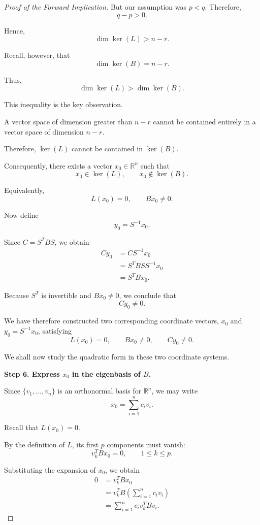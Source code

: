 \documentclass[11pt]{article}
\theoremstyle{definition}
\theoremstyle{remark}
\begin{document}
\begin{proof}[Proof of the Forward Implication]
But our assumption was $p<q$.
Therefore,
\[
    q-p>0.
\]

Hence,
\[
    \boxed{\dim\ker(L)>n-r}.
\]

Recall, however, that
\[
    \dim\ker(B)=n-r.
\]

Thus,
\[
    \boxed{
    \dim\ker(L)>\dim\ker(B).
    }
\]

This inequality is the key observation.

A vector space of dimension greater
than $n-r$ cannot be contained entirely
in a vector space of dimension $n-r$.

Therefore, $\ker(L)$ cannot be contained
in $\ker(B)$.

Consequently, there exists a vector
$x_0\in\mathbb{R}^n$ such that
\[
    \boxed{
    x_0\in\ker(L),
    \qquad
    x_0\notin\ker(B).
    }
\]

Equivalently,
\[
    \boxed{
    L(x_0)=0,
    \qquad
    Bx_0\neq 0.
    }
\]

Now define
\[
    \boxed{y_0=S^{-1}x_0}.
\]

Since $C=S^TBS$, we obtain
\[
\begin{aligned}
    Cy_0
    &=CS^{-1}x_0\\
    &=S^TBS S^{-1}x_0\\
    &=S^TBx_0.
\end{aligned}
\]

Because $S^T$ is invertible and
$Bx_0\neq 0$, we conclude that
\[
    \boxed{Cy_0\neq 0}.
\]

We have therefore constructed two
corresponding coordinate vectors,
$x_0$ and $y_0=S^{-1}x_0$, satisfying
\[
    L(x_0)=0,
    \qquad
    Bx_0\neq 0,
    \qquad
    Cy_0\neq 0.
\]

We shall now study the quadratic form
in these two coordinate systems.

\medskip

\textbf{Step 6. Express $x_0$ in the eigenbasis of $B$.}

Since $\{v_1,\ldots,v_n\}$ is an
orthonormal basis for $\mathbb{R}^n$,
we may write
\[
    x_0=\sum_{i=1}^{n}c_iv_i.
\]

Recall that $L(x_0)=0$.

By the definition of $L$, its first
$p$ components must vanish:
\[
    v_k^TBx_0=0,
    \qquad 1\leq k\leq p.
\]

Substituting the expansion of $x_0$,
we obtain
\[
\begin{aligned}
    0
    &=v_k^TBx_0\\
    &=v_k^TB
      \left(\sum_{i=1}^{n}c_iv_i\right)\\
    &=\sum_{i=1}^{n}c_iv_k^TBv_i.
\end{aligned}
\]


\end{proof}
\end{document}
